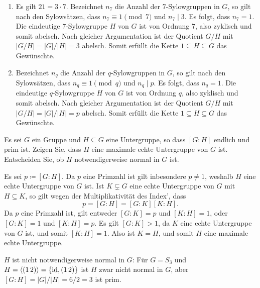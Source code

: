 \begin{solution}
\begin{enumerate}[resume]
    \item
      Es gilt $21 = 3 \cdot 7$.
      Bezeichnet $n_7$ die Anzahl der $7$-Sylowgruppen in $G$, so gilt nach den Sylowsätzen, dass $n_7 \equiv 1 \pmod{7}$ und $n_7 \mid 3$.
      Es folgt, dass $n_7  = 1$.
      Die eindeutige $7$-Sylowgruppe $H$ von $G$ ist von Ordnung $7$, also zyklisch und somit abelsch.
      Nach gleicher Argumentation ist der Quotient $G/H$ mit $|G/H| = |G|/|H| = 3$ abelsch.
      Somit erfüllt die Kette $1 \subseteq H \subseteq G$ das Gewünschte.
      
    \item
      Bezeichnet $n_q$ die Anzahl der $q$-Sylowgruppen in $G$, so gilt nach den Sylowsätzen, dass $n_q \equiv 1 \pmod{q}$ und $n_q \mid p$.
      Es folgt, dass $n_q  = 1$.
      Die eindeutige $q$-Sylowgruppe $H$ von $G$ ist von Ordnung $q$, also zyklisch und somit abelsch.
      Nach gleicher Argumentation ist der Quotient $G/H$ mit $|G/H| = |G|/|H| = p$ abelsch.
      Somit erfüllt die Kette $1 \subseteq H \subseteq G$ das Gewünschte.
  \end{enumerate}
\end{solution}


\begin{question}[subtitle = Ein Kriterium für maximale Untergruppen]
  Es sei $G$ ein Gruppe und $H \subseteq G$ eine Untergruppe, so dass $[G : H]$ endlich und prim ist.
  Zeigen Sie, dass $H$ eine maximale echte Untergruppe von $G$ ist. Entscheiden Sie, ob $H$ notwendigerweise normal in $G$ ist.
\end{question}


\begin{solution}
  Es sei $p \coloneqq [G : H]$.
  Da $p$ eine Primzahl ist gilt inbesondere $p \neq 1$, weshalb $H$ eine echte Untergruppe von $G$ ist.
  Ist $K \subsetneq G$ eine echte Untergruppe von $G$ mit $H \subseteq K$, so gilt wegen der Multiplikativität des Index’, dass 
  \[
      p
    = [G : H]
    = [G : K] [K : H].
  \]
  Da $p$ eine Primzahl ist, gilt entweder $[G : K] = p$ und $[K : H] = 1$, oder $[G : K] = 1$ und $[K : H] = p$.
  Es gilt $[G : K] > 1$, da $K$ eine echte Untergruppe von $G$ ist, und somit $[K : H] = 1$.
  Also ist $K = H$, und somit $H$ eine maximale echte Untergruppe.
  
  $H$ ist nicht notwendigerweise normal in $G$:
  Für $G = S_3$ und $H = \left\langle (1\,2) \right\rangle = \{\operatorname{id}, (1\,2)\}$ ist $H$ zwar nicht normal in $G$, aber $[G : H] = |G|/|H| = 6/2 = 3$ ist prim.
\end{solution}


